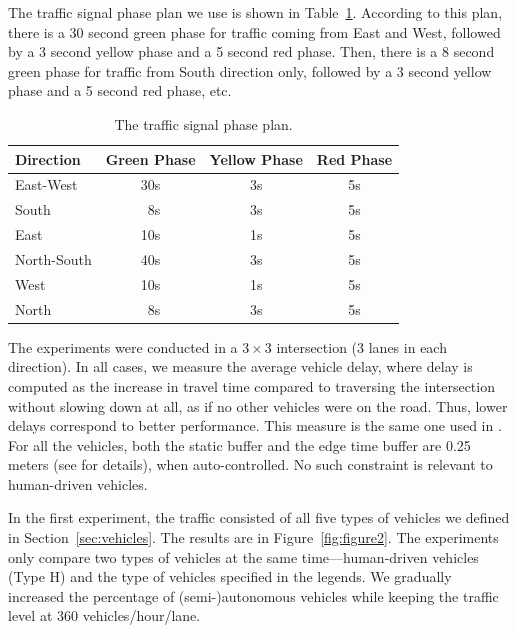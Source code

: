 The traffic signal phase plan we use is shown in
Table~\ref{table:phase}.
According to this plan, there is a 30 second
green phase for traffic coming from East and West, followed by a 3
second yellow phase and a 5 second red phase. Then, there is a 8
second green phase for traffic from South direction only, followed by
a 3 second yellow phase and a 5 second red phase, etc.

\begin{table}
\caption{The traffic signal phase plan.}
\label{table:phase}
\centering
\begin{tabular}{|l|c|c|c|}
\hline
Direction & Green Phase & Yellow Phase & Red Phase \\
\hline
  East-West & 30s & 3s & 5s \\
  South & \ 8s & 3s & 5s \\
  East & 10s & 1s & 5s \\
  North-South & 40s & 3s & 5s \\
  West & 10s & 1s & 5s \\
  North & \ 8s & 3s & 5s \\
\hline
\end{tabular}
\end{table}

The experiments were conducted in a $3 \times 3$ intersection (3 lanes
in each direction).  In all cases, we measure the average vehicle delay,
where delay is computed as the increase in travel time compared to
traversing the intersection without slowing down at all, as if no
other vehicles were on the road. Thus, lower delays correspond to
better performance.  This measure is the same one used in
\cite{bib:Dresner08Multiagent}. For all the vehicles, both the static
buffer and the edge time buffer are 0.25 meters (see
\cite{bib:Dresner08Multiagent} for details), when auto-controlled.  No
such constraint is relevant to human-driven vehicles. 

In the first experiment, the traffic consisted of all five types of
vehicles we defined in Section~\ref{sec:vehicles}. The results are in
Figure~\ref{fig:figure2}. The experiments only compare two types of
vehicles at the same time---human-driven vehicles (Type H) and the
type of vehicles specified in the legends. We gradually increased the
percentage of (semi-)autonomous vehicles while keeping the traffic
level at 360 vehicles/hour/lane.

